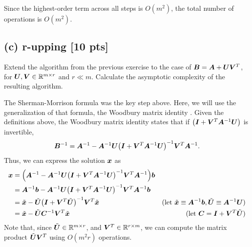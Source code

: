 \documentclass[twoside,10pt]{article}
\begin{document}
\quad Since the highest-order term across all steps is $O(m^2)$, the total number of operations is $O(m^2)$.

\subsection*{(c) r-upping [10 pts]}
Extend the algorithm from the previous exercise to the case of $\bm{B} = \bm{A} + \bm{U}\bm{V}^{T}$, for $\bm{U},\bm{V} \in \mathbb{R}^{m \times r}$ and $r \ll m$.
Calculate the asymptotic complexity of the resulting algorithm.

\quad The Sherman-Morrison formula was the key step above.
Here, we will use the generalization of that formula, the Woodbury matrix identity \cite{woodbury_1950}.
Given the definitions above, the Woodbury matrix identity states that if $\left(\mtx{I} + \mtx{V}^T\mtx{A}^{-1} \mtx{U}\right)$ is invertible,
$$\mtx{B}^{-1} = \mtx{A}^{-1} - \mtx{A}^{-1}\mtx{U} \left(\mtx{I} + \mtx{V}^T\mtx{A}^{-1}\mtx{U}\right)^{-1} \mtx{V}^T\mtx{A}^{-1}.$$
Thus, we can express the solution $\bm{x}$ as
\begin{align*}
  \vct{x} &= \left(\mtx{A}^{-1} - \mtx{A}^{-1}\mtx{U} \left(\mtx{I} + \mtx{V}^T\mtx{A}^{-1}\mtx{U}\right)^{-1} \mtx{V}^T\mtx{A}^{-1}\right)\vct{b}\\
  &= \mtx{A}^{-1}\vct{b} - \mtx{A}^{-1}\mtx{U} \left(\mtx{I} + \mtx{V}^T\mtx{A}^{-1}\mtx{U}\right)^{-1} \mtx{V}^T\mtx{A}^{-1}\vct{b}\\
  &= \tilde{\vct{x}} - \tilde{\mtx{U}} \left(\mtx{I} + \mtx{V}^T\tilde{\mtx{U}}\right)^{-1} \mtx{V}^T\tilde{\vct{x}} &\text{(let $\tilde{\vct{x}} \equiv \mtx{A}^{-1}\vct{b}, \tilde{\mtx{U}} \equiv \mtx{A}^{-1}\mtx{U}$)}\\
  &= \tilde{\vct{x}} - \tilde{\mtx{U}} \mtx{C}^{-1}\mtx{V}^T\tilde{\vct{x}} &\text{(let $\mtx{C} = \mtx{I} + \mtx{V}^T\tilde{\mtx{U}}$)}
\end{align*}
Note that, since $\tilde{\bm{U}} \in \mathbb{R}^{m \times r}$, and $\bm{V}^T \in \mathbb{R}^{r \times m}$, we can compute the matrix product $\tilde{\bm{U}}\bm{V}^T$ using $O(m^2r)$ operations.
\end{document}
